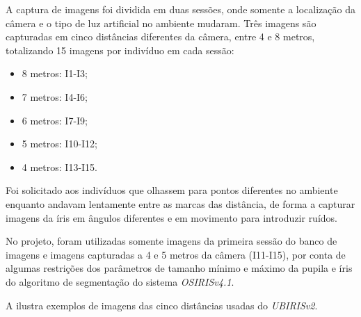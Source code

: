 \par A captura de imagens foi dividida em duas sessões, onde somente a localização da câmera e o tipo de luz artificial no ambiente mudaram. Três imagens são capturadas em cinco distâncias diferentes da câmera, entre 4 e 8 metros, totalizando 15 imagens por indivíduo em cada sessão: 

\begin{itemize}
    \item 8 metros: I1-I3;
    \item 7 metros: I4-I6;
    \item 6 metros: I7-I9;
    \item 5 metros: I10-I12;
    \item 4 metros: I13-I15.
\end{itemize}

\par Foi solicitado aos indivíduos que olhassem para pontos diferentes no ambiente enquanto andavam lentamente entre as marcas das distância, de forma a capturar imagens da íris em ângulos diferentes e em movimento para introduzir ruídos.

\par No projeto, foram utilizadas somente imagens da primeira sessão do banco de imagens e imagens capturadas a 4 e 5 metros da câmera (I11-I15), por conta de algumas restrições dos parâmetros de tamanho mínimo e máximo da pupila e íris do algoritmo de segmentação do sistema \textit{OSIRISv4.1}.

\par A  ilustra exemplos de imagens das cinco distâncias usadas do \textit{UBIRISv2}.

